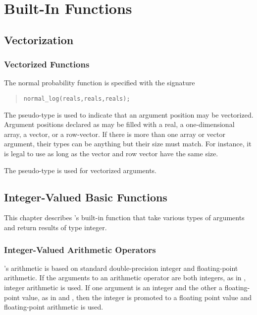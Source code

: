 \part{Built-In Functions}\label{built-in-functions.part}


\chapter{Vectorization}

\section{Vectorized Functions}\label{prob-vectorization.section}

The normal probability function is specified with the signature
%
\begin{quote}
\begin{Verbatim}
normal_log(reals,reals,reals);
\end{Verbatim}
\end{quote}
%
The pseudo-type  is used to indicate that an argument
position may be vectorized.  Argument positions declared as
 may be filled with a real, a one-dimensional array, a
vector, or a row-vector.  If there is more than one array or vector
argument, their types can be anything but their size must match.  For
instance, it is legal to use
 as long as the vector and
row vector have the same size.

The pseudo-type  is used for vectorized arguments.


\chapter{Integer-Valued Basic Functions}

\noindent
This chapter describes \Stan's built-in function that take various
types of arguments and return results of type integer.


\section{Integer-Valued Arithmetic Operators}\label{int-arithmetic.section}

\Stan's arithmetic is based on standard double-precision \Cpp integer and
floating-point arithmetic.  If the arguments to an arithmetic operator
are both integers, as in , integer arithmetic is used.  If
one argument is an integer and the other a floating-point value, as in
 and , then the integer is promoted to a floating
point value and floating-point arithmetic is used.

